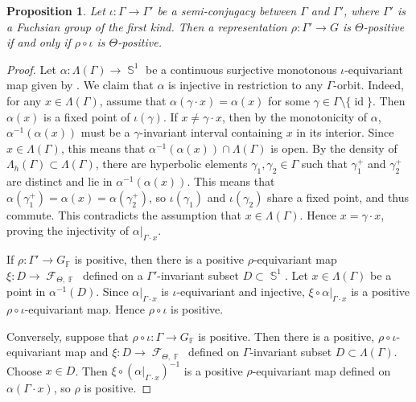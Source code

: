\documentclass{amsart}
\theoremstyle{plain}
\newtheorem{proposition}{Proposition}[section]
\theoremstyle{definition}
\DeclareMathOperator{\id}{id}
\DeclareMathOperator{\Fc}{\mathcal{F}}
\DeclareMathOperator{\Fb}{{\mathbb{F}}}
\DeclareMathOperator{\Sb}{\mathbb{S}}
\newcommand{\1}{\mathbf{1}}
\begin{document}
\begin{proposition}\label{propo: equivalence positivity first and second kind Fuchsian groups}
    Let $\iota:\Gamma \to \Gamma'$ be a semi-conjugacy between $\Gamma$ and $\Gamma'$, where $\Gamma'$ is a Fuchsian group of the first kind. Then a representation $\rho: \Gamma' \to G$ is $\Theta$-positive if and only if $\rho\circ \iota$ is $\Theta$-positive.
\end{proposition}
\begin{proof}
    Let $\alpha:\Lambda(\Gamma) \to \Sb^1$ be a continuous surjective monotonous $\iota$-equivariant map given by .
    We claim that $\alpha$ is injective in restriction to any $\Gamma$-orbit. Indeed, for any $x\in \Lambda(\Gamma)$, assume that $\alpha(\gamma\cdot x)= \alpha(x)$ for some $\gamma\in\Gamma\setminus\{\id\}$. Then $\alpha(x)$ is a fixed point of $\iota(\gamma)$. If $x\neq \gamma \cdot x$, then by the monotonicity of $\alpha$, $\alpha^{-1}(\alpha(x))$ must be a $\gamma$-invariant interval containing $x$ in its interior. Since $x\in\Lambda(\Gamma)$, this means that $\alpha^{-1}(\alpha(x))\cap\Lambda(\Gamma)$ is open. By the density of $\Lambda_h(\Gamma)\subset\Lambda(\Gamma)$, there are hyperbolic elements $\gamma_1,\gamma_2\in\Gamma$ such that $\gamma_1^+$ and $\gamma_2^+$ are distinct and lie in $\alpha^{-1}(\alpha(x))$.
    This means that $\alpha(\gamma_1^+)=\alpha(x)=\alpha(\gamma_2^+)$, so $\iota(\gamma_1)$ and $\iota(\gamma_2)$ share a fixed point, and thus commute.
    This contradicts the assumption that $x\in \Lambda(\Gamma)$. Hence $x= \gamma\cdot x$, proving the injectivity of $\alpha\vert_{ \Gamma \cdot x}$.

    If $\rho\colon\Gamma'\to G_{\Fb}$ is positive, then there is a positive $\rho$-equivariant map $\xi:D \to \Fc_{\Theta,\Fb}$ defined on a $\Gamma'$-invariant subset $D\subset\Sb^1$. Let $x\in \Lambda(\Gamma)$ be a point in $\alpha^{-1}(D)$. Since $\alpha|_{\Gamma\cdot x}$ is $\iota$-equivariant and injective, $\xi \circ \alpha\vert_{ \Gamma \cdot x}$ is a positive $\rho\circ \iota$-equivariant map. Hence $\rho \circ \iota$ is positive.

    Conversely, suppose that $\rho\circ\iota\colon\Gamma\to G_{\Fb}$ is positive. Then there is a positive, $\rho\circ\iota$-equivariant map and $\xi: D\to \Fc_{\Theta,\Fb}$ defined on $\Gamma$-invariant subset $D\subset \Lambda(\Gamma)$. Choose $x\in D$. Then $\xi\circ (\alpha|_{\Gamma\cdot x})^{-1}$ is a positive $\rho$-equivariant map defined on $\alpha(\Gamma\cdot x)$, so $\rho$ is positive.
\end{proof}
\end{document}
